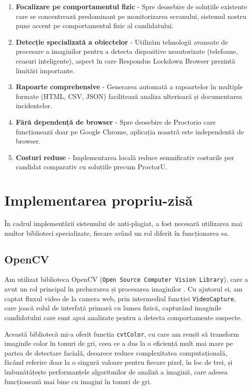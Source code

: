 \documentclass[12pt,a4paper]{article}
\begin{document}
\begin{enumerate}
    \item \textbf{Focalizare pe comportamentul fizic} - Spre deosebire de soluțiile existente care se concentrează predominant pe monitorizarea ecranului, sistemul nostru pune accent pe comportamentul fizic al candidatului.
    
    \item \textbf{Detecție specializată a obiectelor} - Utilizăm tehnologii avansate de procesare a imaginilor pentru a detecta dispozitive neautorizate (telefoane, ceasuri inteligente), aspect în care Respondus Lockdown Browser prezintă limitări importante.
    
    \item \textbf{Rapoarte comprehensive} - Generarea automată a rapoartelor în multiple formate (HTML, CSV, JSON) facilitează analiza ulterioară și documentarea incidentelor.
    
    \item \textbf{Fără dependență de browser} - Spre deosebire de Proctorio care funcționează doar pe Google Chrome, aplicația noastră este independentă de browser.
    
    \item \textbf{Costuri reduse} - Implementarea locală reduce semnificativ costurile per candidat comparativ cu soluțiile precum ProctorU.
\end{enumerate}

\section{Implementarea propriu-zisă}

În cadrul implementării sistemului de anti-plagiat, a fost necesară utilizarea mai multor biblioteci specializate, fiecare având un rol diferit în funcționarea sa.

\subsection{OpenCV}
Am utilizat biblioteca OpenCV (\texttt{Open Source Computer Vision Library}),
care a avut un rol principal în prelucrarea și procesarea imaginilor \cite{opencv}. Cu
ajutorul ei, am captat fluxul video de la camera web, prin intermediul
funcției \texttt{VideoCapture}, care joacă rolul de interfață primară cu lumea
fizică, capturând imaginile candidatului care sunt apoi analizate pentru
a detecta comportamente suspecte.

Această bibliotecă mi-a oferit funcția \texttt{cvtColor}, cu care am reușit să
transform imaginile color în tonuri de gri, ceea ce a dus la o eficiență
mult mai mare pe partea de detectare facială, deoarece reduce
complexitatea computațională, făcând referire doar la o singură valoare
pentru fiecare pixel, în loc de trei, și îmbunătățește performanțele
algoritmilor de analiză a imaginii, care adesea funcționează mai bine cu
imagini în tonuri de gri.
\end{document}
